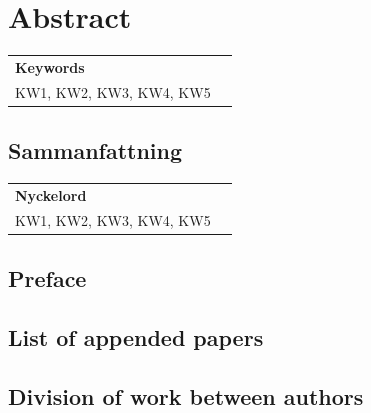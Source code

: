 \documentclass[10pt,twoside]{book}
\begin{document}

\frontmatter
\chapter*{Abstract}
\thispagestyle{empty}

\begin{table}[b!]
\small
\begin{tabular}{lr}
    \textbf{Keywords}\\
    KW1, KW2, KW3, KW4, KW5
\end{tabular}
\end{table}
\thispagestyle{empty}
\newpage

\section*{Sammanfattning}
\thispagestyle{empty}

\begin{table}[b!]
\small
\begin{tabular}{lr}
    \textbf{Nyckelord}\\
    KW1, KW2, KW3, KW4, KW5
\end{tabular}
\end{table}
\newpage

\section*{Preface}

\newpage

\section*{List of appended papers}

\newpage

\section*{Division of work between authors}

\newpage
\clearpage{\pagestyle{empty}\cleardoublepage} %
\end{document}
